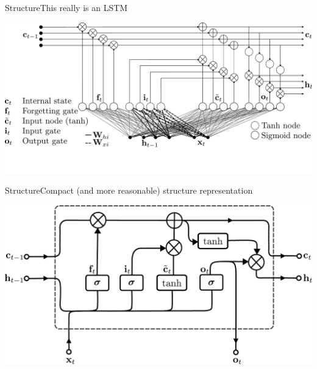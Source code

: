 \documentclass{beamer}
\begin{document}
\begin{frame}{Structure}{This really is an LSTM}
\begin{center}
\includegraphics[scale=0.22]{Module 5 (RNN)/pics/LSTM_gates_as_NN.pdf}    
\end{center}
\end{frame}
\begin{frame}{Structure}{Compact (and more reasonable) structure representation}
\begin{center}
    \includegraphics[scale=0.4]{ Module 5 (RNN)/pics/Long_Short-Term_Memory.pdf}
\end{center}
\end{frame}
\end{document}
